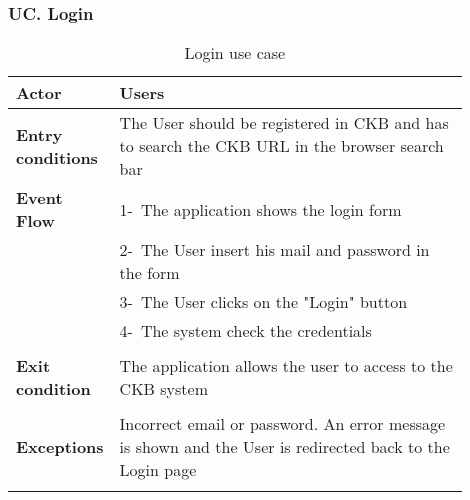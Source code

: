 \subsubsection*{UC\cuc . Login}
\begin{center}
    \begin{longtable}{|l|p{0.9\linewidth}|}
        \hline
        \textbf{Actor}            & Users                                                                                                                                                                                        \\
        \hline
        \textbf{Entry conditions} & The User should be registered in CKB and has to search the CKB URL in the browser search bar                                                                                                                   \\
        \hline
        \textbf{Event Flow}       & 1-\ The application shows the login form                                                     \\
        & 2-\ The User insert his mail and password in the form \\
        & 3-\ The User clicks on the "Login" button       \\                                                                                                                      
        & 4-\ The system check the credentials  \\                                                                                                                                                                                                                                     \\
        \hline
        \textbf{Exit condition}   & The application allows the user to access to the CKB system \\                                                                                                                                                                                \\
        \hline
        \textbf{Exceptions}       & Incorrect email or password. An error message is shown and the User is redirected back to the Login page                                                                                                                        \\
        \hline
        \caption{Login use case}
        \label{tab: login_use_case}
    \end{longtable}
\end{center}


